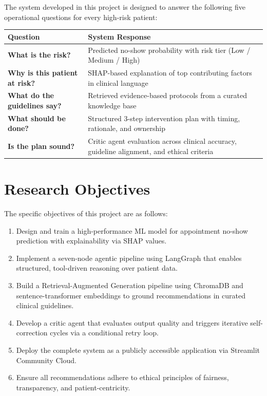 \documentclass[12pt, a4paper]{report}
\begin{document}
\vspace{0.5cm}

The system developed in this project is designed to answer the following five operational questions for every high-risk patient:

\vspace{0.3cm}
\renewcommand{\arraystretch}{1.7}
\begin{tabularx}{\textwidth}{>{\bfseries\color{primaryblue}}l X}
  \toprule
  \rowcolor{boxbg}
  \textbf{Question} & \textbf{System Response} \\
  \midrule
  What is the risk?            & Predicted no-show probability with risk tier (Low / Medium / High) \\
  Why is this patient at risk? & SHAP-based explanation of top contributing factors in clinical language \\
  What do the guidelines say?  & Retrieved evidence-based protocols from a curated knowledge base \\
  What should be done?         & Structured 3-step intervention plan with timing, rationale, and ownership \\
  \rowcolor{boxbg}
  Is the plan sound?           & Critic agent evaluation across clinical accuracy, guideline alignment, and ethical criteria \\
  \bottomrule
\end{tabularx}

\vspace{0.5cm}

\section{Research Objectives}

The specific objectives of this project are as follows:

\begin{enumerate}
  \item Design and train a high-performance ML model for appointment no-show prediction with explainability via SHAP values.
  \item Implement a seven-node agentic pipeline using LangGraph that enables structured, tool-driven reasoning over patient data.
  \item Build a Retrieval-Augmented Generation pipeline using ChromaDB and sentence-transformer embeddings to ground recommendations in curated clinical guidelines.
  \item Develop a critic agent that evaluates output quality and triggers iterative self-correction cycles via a conditional retry loop.
  \item Deploy the complete system as a publicly accessible application via Streamlit Community Cloud.
  \item Ensure all recommendations adhere to ethical principles of fairness, transparency, and patient-centricity.
\end{enumerate}
\end{document}
